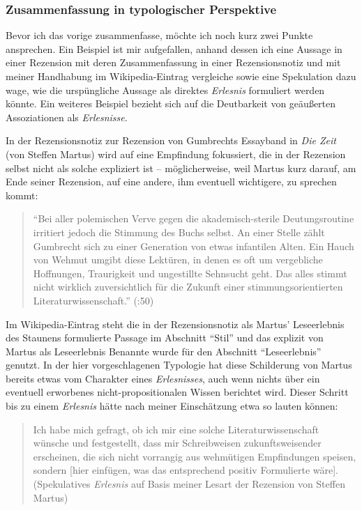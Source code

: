 \documentclass[fontsize=12pt]{scrartcl}
\begin{document}
\subsubsection{Zusammenfassung in typologischer Perspektive}
\label{subsubsec:7.1.5}

Bevor ich das vorige zusammenfasse, m\"ochte ich noch kurz zwei Punkte ansprechen. Ein Beispiel ist mir aufgefallen, anhand dessen ich eine Aussage in einer Rezension mit deren Zusammenfassung in einer Rezensionsnotiz und mit meiner Handhabung im Wi\-ki\-pe\-dia-Eintrag vergleiche sowie eine Spekulation dazu wage, wie die ursp\"ung\-liche Aussage als direktes \textit{Erlesnis} formuliert werden k\"onnte. Ein weiteres Beispiel bezieht sich auf die Deutbarkeit von ge\"au{\ss}erten Assoziationen als \textit{Erlesnisse}.

In der Rezensionsnotiz zur Rezension von Gumbrechts Essayband in \textit{Die Zeit} (von Steffen Martus) wird auf eine Empfindung fokussiert, die in der Rezension \mbox{selbst} nicht als solche expliziert ist -- m\"oglicherweise, weil Martus kurz darauf, am Ende seiner Rezension, auf eine andere, ihm eventuell wichtigere, zu sprechen kommt:

\singlespacing 
\begin{quote}
"`Bei aller polemischen Verve gegen die akademisch-sterile Deutungsroutine irritiert jedoch die \flq Stimmung\frq \,\,des Buchs \mbox{selbst}. An einer Stelle z\"ahlt Gumbrecht sich zu einer \flq Generation von etwas infantilen Alten\frq. Ein Hauch von Wehmut umgibt diese Lekt\"uren, in denen es oft um ver\-geb\-li\-che Hoffnungen, Traurigkeit und ungestillte Sehnsucht geht. Das alles stimmt nicht wirklich zuversichtlich f\"ur die Zukunft einer \flq stimmungsorientierten\frq \,\,Li\-te\-ra\-tur\-wissenschaft."' (\cite{Martus2011}:50)
\end{quote}
\onehalfspacing

Im Wi\-ki\-pe\-dia-Eintrag steht die in der Rezensionsnotiz als Martus' Leseerlebnis des Staunens formulierte Passage im Abschnitt "`Stil"' und das explizit von Martus als Leseerlebnis Benannte wurde f\"ur den Abschnitt "`Leseerlebnis"' genutzt. In der \mbox{hier} vorgeschlagenen Typologie hat diese Schilderung von Martus bereits etwas vom Charakter eines \textit{Erlesnisses}, auch wenn nichts \"uber ein eventuell erworbenes nicht-pro\-po\-si\-ti\-o\-na\-len Wissen berichtet wird. Dieser Schritt bis zu einem \textit{Erlesnis} h\"atte nach meiner Einsch\"atzung etwa so lauten k\"onnen:

\singlespacing
\begin{quote}
Ich habe mich gefragt, ob ich mir eine solche Li\-te\-ra\-tur\-wissenschaft w\"un\-sche und festgestellt, dass mir Schreibweisen zukunftsweisender er\-schei\-nen, die sich nicht vorrangig aus wehm\"utigen Emp\-fin\-dun\-gen speisen, sondern [\mbox{hier} einf\"ugen, was das entsprechend positiv Formulierte w\"are].\\ (Spekulatives \textit{Erlesnis} auf Basis meiner Lesart der Rezension von Steffen Martus)
\end{quote}
\onehalfspacing
\end{document}
